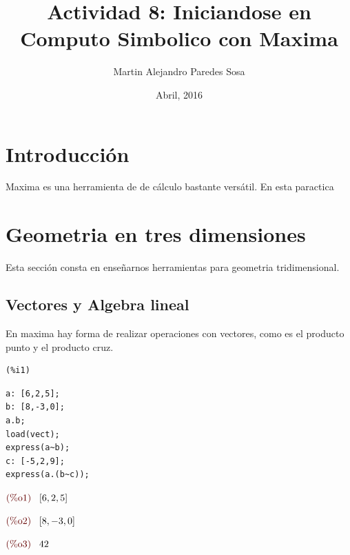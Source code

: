\documentclass[12pt]{article}
\title{Actividad 8: Iniciandose en Computo Simbolico con Maxima}
\author{Martin Alejandro Paredes Sosa}
\date{Abril, 2016}
\begin{document}
\maketitle

\section{Introducción}
Maxima es una herramienta de de cálculo bastante versátil. En esta paractica 


\section{Geometria en tres dimensiones}
Esta sección consta en enseñarnos herramientas para geometria tridimensional.
\subsection{Vectores y Algebra lineal}
En maxima hay forma de realizar operaciones con vectores, como es el producto punto y el producto cruz.

\noindent

\begin{minipage}[t]{8ex}{\color{red}\bf
\begin{verbatim}
(%i1) 
\end{verbatim}}
\end{minipage}
\begin{minipage}[t]{\textwidth}{\color{blue}
\begin{verbatim}
a: [6,2,5];
b: [8,-3,0];
a.b;
load(vect);
express(a~b);
c: [-5,2,9];
express(a.(b~c));
\end{verbatim}}
\end{minipage}

\begin{math}\displaystyle
\parbox{8ex}{\color{labelcolor}(\%o1) }
[6,2,5]
\end{math}

\begin{math}\displaystyle
\parbox{8ex}{\color{labelcolor}(\%o2) }
[8,-3,0]
\end{math}

\begin{math}\displaystyle
\parbox{8ex}{\color{labelcolor}(\%o3) }
42
\end{math}
\end{document}
